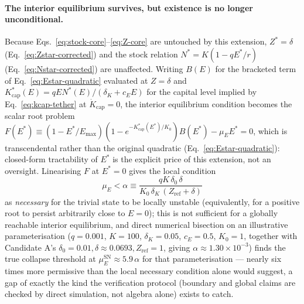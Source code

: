 \documentclass[twocolumn,10pt]{article}
\begin{document}
\paragraph{The interior equilibrium survives, but existence is no longer unconditional.} Because Eqs.~\eqref{eq:stock-core}--\eqref{eq:Z-core} are untouched by this extension, $Z^*=\delta$ (Eq.~\eqref{eq:Zstar-corrected}) and the stock relation $N^*=K(1-qE^*/r)$ (Eq.~\eqref{eq:Nstar-corrected}) are unaffected. Writing $B(E)$ for the bracketed term of Eq.~\eqref{eq:Estar-quadratic} evaluated at $Z=\delta$ and $K_{\text{cap}}^*(E)=qEN^*(E)/(\delta_K+c_EE)$ for the capital level implied by Eq.~\eqref{eq:kcap-tether} at $\dot K_{\text{cap}}=0$, the interior equilibrium condition becomes the scalar root problem $F(E^*)\equiv(1-E^*/E_{\max})(1-e^{-K_{\text{cap}}^*(E^*)/K_0})B(E^*)-\mu_EE^*=0$, which is transcendental rather than the original quadratic (Eq.~\eqref{eq:Estar-quadratic}): closed-form tractability of $E^*$ is the explicit price of this extension, not an oversight. Linearising $F$ at $E^*=0$ gives the local condition
\begin{equation}
\mu_E<\alpha\equiv\frac{qK\,\delta_0\,\delta}{K_0\,\delta_K\,(Z_{\text{ref}}+\delta)} \label{eq:mu-E-necessary}
\end{equation}
as \emph{necessary} for the trivial state to be locally unstable (equivalently, for a positive root to persist arbitrarily close to $E=0$); this is not sufficient for a globally reachable interior equilibrium, and direct numerical bisection on an illustrative parameterisation ($q=0.001$, $K=100$, $\delta_K=0.05$, $c_E=0.5$, $K_0=1$, together with Candidate A's $\delta_0=0.01,\delta\approx0.0693,Z_{\text{ref}}=1$, giving $\alpha\approx1.30\times10^{-3}$) finds the true collapse threshold at $\mu_E^{\text{SN}}\approx5.9\,\alpha$ for that parameterisation — nearly six times more permissive than the local necessary condition alone would suggest, a gap of exactly the kind the verification protocol (boundary and global claims are checked by direct simulation, not algebra alone) exists to catch.
\end{document}
